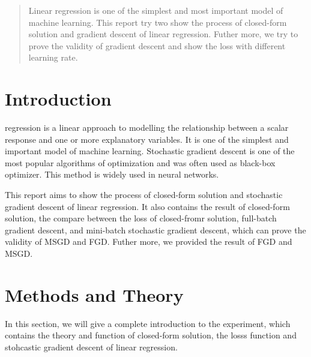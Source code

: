 \documentclass[journal, a4paper]{IEEEtran}
\begin{document}
\begin{abstract}
Linear regression is one of the simplest and most important model of machine learning. This report try two show the process of closed-form solution and gradient descent of linear regression. Futher more, we try to prove the validity of gradient descent and show the loss with different learning rate. 
\end{abstract}

\section{Introduction}
 regression is a linear approach to modelling the relationship between a scalar response and one or more explanatory variables. It is one of the simplest and important model of machine learning. Stochastic gradient descent is one of the most popular algorithms of optimization and was often used as black-box optimizer. This method is widely used in neural networks.

This report aims to show the process of closed-form solution and stochastic gradient descent of linear regression. It also contains the result of closed-form solution, the compare between the loss of closed-fromr solution, full-batch gradient descent, and mini-batch stochastic gradient descent, which can prove the validity of MSGD and FGD. Futher more,  we provided the result of FGD and MSGD. 

\section{Methods and Theory}
In this section, we will give a complete introduction to the experiment, which contains the theory and function of closed-form solution, the losss function and stohcastic gradient descent of linear regression.
\end{document}
